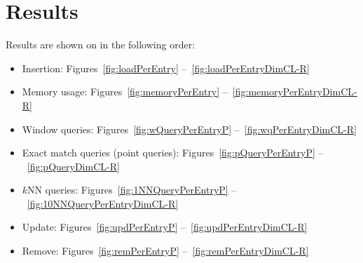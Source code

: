 \documentclass{sig-alternate}
\begin{document}
%


\section{Results}
Results are shown on in the following order:

\begin{itemize}
	\item Insertion: Figures~\ref{fig:loadPerEntry} --~\ref{fig:loadPerEntryDimCL-R}
	\item Memory usage: Figures~\ref{fig:memoryPerEntry} --~\ref{fig:memoryPerEntryDimCL-R}
	\item Window queries: Figures~\ref{fig:wQueryPerEntryP} --~\ref{fig:wqPerEntryDimCL-R}
	\item Exact match queries (point queries): Figures~\ref{fig:pQueryPerEntryP} --~\ref{fig:pQueryDimCL-R}
	\item $k$NN queries: Figures~\ref{fig:1NNQueryPerEntryP} --~\ref{fig:10NNQueryPerEntryDimCL-R}
	\item Update: Figures~\ref{fig:updPerEntryP} --~\ref{fig:updPerEntryDimCL-R}
	\item Remove: Figures~\ref{fig:remPerEntryP} --~\ref{fig:remPerEntryDimCL-R}
\end{itemize}




\clearpage
\newpage



\clearpage
\newpage




\clearpage
\newpage



\clearpage
\newpage



\clearpage
\newpage



\clearpage
\newpage



\clearpage
\newpage
\end{document}
